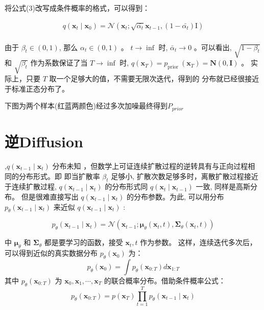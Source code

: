 \documentclass[]{ctexart}
\begin{document}
将公式(3)改写成条件概率的格式，可以得到：

$$
\begin{gathered}
q\left(\mathbf{x}_t \mid \mathbf{x}_{0}\right)=\mathcal{N}\left(\mathbf{x}_t ; \sqrt{\bar{\alpha_t}} \mathbf{x}_{t-1}, (1-\bar{\alpha_t}) \mathrm{I}\right) \\
\end{gathered}
$$

由于 $\beta_t \in(0,1)$, 那么 $\alpha_t \in(0,1)$ 。 $t \rightarrow \inf$ 时, $\bar{\alpha}_t \rightarrow 0$ 。可以看出, $\sqrt{1-\beta_t}$ 和 $\sqrt{\beta_t}$ 
作为系数保证了当 $T \rightarrow \inf$ 时, $q\left(\mathbf{x}_T\right)=p_{\text {prior }}\left(\mathbf{x}_T\right)=\mathbf{N}(0, \mathbf{I})$ 。
实际上，只要 $T$ 取一个足够大的值，不需要无限次迭代，得到的 分布就已经很接近于标准正态分布了。

下图为两个样本(红蓝两颜色)经过多次加噪最终得到$P_{prior}$

\section{逆Diffusion}
,$q\left(\mathbf{x}_{t-1} \mid \mathbf{x}_t\right)$ 分布未知
，但数学上可证连续扩散过程的逆转具有与正向过程相同的分布形式。即
即当扩散率 $\beta_t$ 足够小, 扩散次数足够多时，离散扩散过程接近于连续扩散过程, 
$q\left(\mathbf{x}_{t-1} \mid \mathbf{x}_t\right)$ 的分布形式同 $q\left(\mathbf{x}_t \mid \mathbf{x}_{t-1}\right)$ 一致, 同样是高斯分布。
    但是很难直接写出 $q\left(\mathbf{x}_{t-1} \mid \mathbf{x}_t\right)$ 的分布参数。为此, 可以用分布 $p_\theta\left(\mathbf{x}_{t-1} \mid \mathbf{x}_t\right)$ 来近似 $q\left(\mathbf{x}_{t-1} \mid \mathbf{x}_t\right)$ :

$$
p_\theta\left(\mathbf{x}_{t-1} \mid \mathbf{x}_t\right)=\mathcal{N}\left(\mathbf{x}_{t-1} ; \boldsymbol{\mu}_\theta\left(\mathbf{x}_t, t\right), \mathbf{\Sigma}_\theta\left(\mathbf{x}_t, t\right)\right)
$$

中 $\boldsymbol{\mu}_\theta$ 和 $\boldsymbol{\Sigma}_\theta$ 都是要学习的函数，接受 $\mathbf{x}_t, t$ 作为参数。
这样，连续迭代多次后，可以得到近似的真实数据分布 $p_\theta\left(\mathbf{x}_0\right)$ 为：
$$
p_\theta\left(\mathbf{x}_0\right)=\int p_\theta\left(\mathbf{x}_{0: T}\right) d \mathbf{x}_{1: T}
$$
其中 $p_\theta\left(\mathbf{x}_{0: T}\right)$ 为 $\mathbf{x}_0, \mathbf{x}_1, \cdots, \mathbf{x}_T$ 的联合概率分布。借助条件概率公式：
$$
p_\theta\left(\mathbf{x}_{0: T}\right)=p\left(\mathbf{x}_T\right) \prod_{t=1}^T p_\theta\left(\mathbf{x}_{t-1} \mid \mathbf{x}_t\right)
$$
\end{document}
